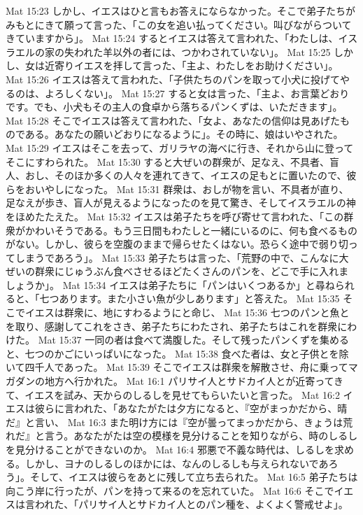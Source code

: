 Mat 15:23  しかし、イエスはひと言もお答えにならなかった。そこで弟子たちがみもとにきて願って言った、「この女を追い払ってください。叫びながらついてきていますから」。
Mat 15:24  するとイエスは答えて言われた、「わたしは、イスラエルの家の失われた羊以外の者には、つかわされていない」。
Mat 15:25  しかし、女は近寄りイエスを拝して言った、「主よ、わたしをお助けください」。
Mat 15:26  イエスは答えて言われた、「子供たちのパンを取って小犬に投げてやるのは、よろしくない」。
Mat 15:27  すると女は言った、「主よ、お言葉どおりです。でも、小犬もその主人の食卓から落ちるパンくずは、いただきます」。
Mat 15:28  そこでイエスは答えて言われた、「女よ、あなたの信仰は見あげたものである。あなたの願いどおりになるように」。その時に、娘はいやされた。
Mat 15:29  イエスはそこを去って、ガリラヤの海べに行き、それから山に登ってそこにすわられた。
Mat 15:30  すると大ぜいの群衆が、足なえ、不具者、盲人、おし、そのほか多くの人々を連れてきて、イエスの足もとに置いたので、彼らをおいやしになった。
Mat 15:31  群衆は、おしが物を言い、不具者が直り、足なえが歩き、盲人が見えるようになったのを見て驚き、そしてイスラエルの神をほめたたえた。
Mat 15:32  イエスは弟子たちを呼び寄せて言われた、「この群衆がかわいそうである。もう三日間もわたしと一緒にいるのに、何も食べるものがない。しかし、彼らを空腹のままで帰らせたくはない。恐らく途中で弱り切ってしまうであろう」。
Mat 15:33  弟子たちは言った、「荒野の中で、こんなに大ぜいの群衆にじゅうぶん食べさせるほどたくさんのパンを、どこで手に入れましょうか」。
Mat 15:34  イエスは弟子たちに「パンはいくつあるか」と尋ねられると、「七つあります。また小さい魚が少しあります」と答えた。
Mat 15:35  そこでイエスは群衆に、地にすわるようにと命じ、
Mat 15:36  七つのパンと魚とを取り、感謝してこれをさき、弟子たちにわたされ、弟子たちはこれを群衆にわけた。
Mat 15:37  一同の者は食べて満腹した。そして残ったパンくずを集めると、七つのかごにいっぱいになった。
Mat 15:38  食べた者は、女と子供とを除いて四千人であった。
Mat 15:39  そこでイエスは群衆を解散させ、舟に乗ってマガダンの地方へ行かれた。
Mat 16:1  パリサイ人とサドカイ人とが近寄ってきて、イエスを試み、天からのしるしを見せてもらいたいと言った。
Mat 16:2  イエスは彼らに言われた、「あなたがたは夕方になると、『空がまっかだから、晴だ』と言い、
Mat 16:3  また明け方には『空が曇ってまっかだから、きょうは荒れだ』と言う。あなたがたは空の模様を見分けることを知りながら、時のしるしを見分けることができないのか。
Mat 16:4  邪悪で不義な時代は、しるしを求める。しかし、ヨナのしるしのほかには、なんのしるしも与えられないであろう」。そして、イエスは彼らをあとに残して立ち去られた。
Mat 16:5  弟子たちは向こう岸に行ったが、パンを持って来るのを忘れていた。
Mat 16:6  そこでイエスは言われた、「パリサイ人とサドカイ人とのパン種を、よくよく警戒せよ」。
